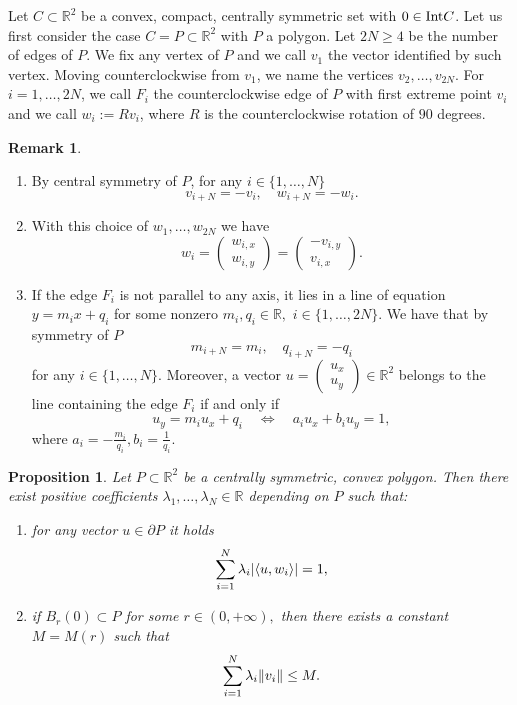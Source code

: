 \documentclass{article}
\numberwithin{equation}{section}
\theoremstyle{plain}%
\newtheorem{proposition}[theorem]{Proposition}
\theoremstyle{definition}
\newtheorem{rem}[theorem]{Remark}
\theoremstyle{definition}
\newcommand{\rgrande}{\mathbb{R}}
\newcommand{\interno}{{\rm Int}}
\DeclarePairedDelimiter{\norma}{\lVert}{\rVert} %
\DeclarePairedDelimiter{\valass}{\lvert}{\rvert} %
\newcommand{\prodscal}[2]{\langle{#1} , {#2} \rangle}
\begin{document}
Let $C \subset \rgrande^2$ be a convex, compact, centrally symmetric set with $0\in\interno C$. Let us first consider the case $C=P \subset \rgrande^2$ with $P$ a polygon.
Let $2N \geq 4$ be the number of edges of $P$. We fix any vertex of $P$ and we call $v_1$ the vector identified by such vertex. Moving counterclockwise from $v_1$, we name the vertices $v_2, \dots, v_{2N}$.
For $i=1, \dots, 2N$, we call $F_i$ the counterclockwise edge of $P$ with first extreme point $v_i$ and we call $w_i:=Rv_i$, where $R$ is the counterclockwise rotation of $90$ degrees.
\begin{rem}\label{remverticiefacce}
    \rm
    \begin{enumerate}
        \item By central symmetry of $P$, for any $i \in \{ 1, \dots, N \}$
        $$
        v_{i+ N} = - v_i, \quad w_{i+ N} = - w_i.
        $$
        \item With this choice of $w_1, \dots, w_{2N}$ we have
        $$
        w_i = \begin{pmatrix}
        w_{i,x} \\
        w_{i,y}
        \end{pmatrix} = \begin{pmatrix}
        -v_{i,y} \\
        v_{i,x}
        \end{pmatrix}
        \text{.}
        $$
        \item If the edge $F_i$ is not parallel to any axis, it lies in a line of equation $ y = m_i x + q_i$ for some nonzero $m_i, q_i \in \rgrande,$ $i \in \{ 1, \dots, 2N \}.$ We have that by symmetry of $P$
        $$
        m_{i +N} = m_i, \quad q_{i + N} = -q_i
        $$
        for any $i \in \{ 1, \dots, N\}.$
        Moreover, a vector $u = \begin{pmatrix}
            u_x \\
            u_y
        \end{pmatrix} \in \rgrande^2$ belongs to the line containing the edge $F_i$ if and only if
        $$
        u_y = m_iu_x + q_i
        \quad
        \iff
        \quad
        a_i u_x + b_i u_y = 1,
        $$
        where $a_i = -\frac{m_i}{q_i}, b_i = \frac{1}{q_i}.$
    \end{enumerate}
\end{rem}
\begin{proposition}\label{igperpoligoni}
Let $P \subset \rgrande^2$ be a centrally symmetric, convex polygon.
Then there exist positive coefficients $\lambda_1, \dots, \lambda_{N} \in \rgrande$ depending on $P$ such that:
\begin{enumerate}
\item\label{enumigperpoligono} for any vector $u \in \partial P$ it holds
\begin{equation}\label{eqigperpoligonipiani}
\sum_{i = 1}^{N} \lambda_i \valass{\prodscal{u}{w_i}} =1,
\end{equation}
\item if $B_r(0) \subset P$ for some $r \in (0, + \infty),$ then there exists a constant $M = M(r)$ such that
    $$
    \sum_{i=1}^{N} \lambda_i \norma{v_i} \leq M.
    $$
\end{enumerate}
\end{proposition}
\end{document}
